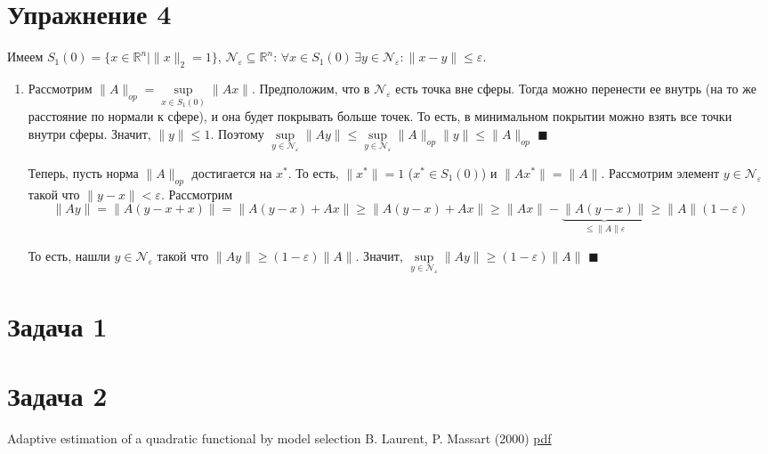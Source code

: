 \documentclass[a4paper]{article}
\newcommand{\R}{\mathbb{R}}
\newcommand{\N}{\mathcal{N}}
\def\eps{\varepsilon}
\begin{document}
\section*{Упражнение 4}
Имеем $S_1(0)=\{x\in\R^n\big|\|x\|_2=1\}$, $\N_\eps\subseteq \R^n\colon\,\forall x\in S_1(0)\,\exists y\in\N_\eps\colon \|x-y\|\leqslant \eps$.
\begin{enumerate}
\item Рассмотрим $\|A\|_{op}=\sup\limits_{x\in S_1(0)}\|Ax\|$. Предположим, что в $\N_\eps$ есть точка вне сферы. Тогда можно перенести ее внутрь (на то же расстояние по нормали к сфере), и она будет покрывать больше точек. То есть, в минимальном покрытии можно взять все точки внутри сферы. Значит, $\|y\|\leqslant 1$. Поэтому $\sup\limits_{y\in\N_\eps}\|Ay\|\leqslant \sup\limits_{y\in \N_\eps}\|A\|_{op}\|y\|\leqslant \|A\|_{op}$ $\blacksquare$

Теперь, пусть норма $\|A\|_{op}$ достигается на $x^*$. То есть, $\|x^*\|=1$ ($x^*\in S_1(0)$) и $\|Ax^*\|=\|A\|$. Рассмотрим элемент $y\in\N_{\eps}$ такой что $\|y-x\|<\eps$. Рассмотрим $$\|Ay\|=\|A(y-x+x)\|=\|A(y-x)+Ax\|\geqslant \|A(y-x)+Ax\|\geqslant\|Ax\|-\underbrace{\|A(y-x)\|}_{\leqslant \|A\|\eps}\geqslant \|A\|(1-\eps)$$

То есть, нашли $y\in \N_\eps$ такой что $\|Ay\|\geqslant (1-\eps)\|A\|$. Значит, $\sup\limits_{y\in \N_\eps}\|Ay\|\geqslant (1-\eps)\|A\|$ $\blacksquare$
\end{enumerate}
\section*{Задача 1}
\section*{Задача 2}
\begin{thebibliography}{9}
Adaptive estimation of a quadratic functional by model selection
B. Laurent, P. Massart (2000)
\href{http://projecteuclid.org/download/pdf_1/euclid.aos/1015957395}{pdf}
\end{thebibliography}
\end{document}
